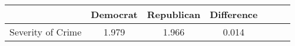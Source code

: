 \begin{tabular}{l*{6}{c}}
                    &    Democrat&  Republican&  Difference   \\
\hline
Severity of Crime   &       1.979&       1.966&       0.014   \\
\end{tabular}
